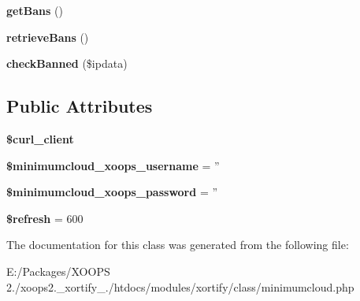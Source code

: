 \begin{DoxyCompactItemize}
\item 
\hypertarget{class_minimumcloud_xortify_exchange_a5246307afd025b45589d908c13a3e924}{{\bfseries get\-Bans} ()}\label{class_minimumcloud_xortify_exchange_a5246307afd025b45589d908c13a3e924}

\item 
\hypertarget{class_minimumcloud_xortify_exchange_a04a4e2d3d688861d870f45b76d5c78bc}{{\bfseries retrieve\-Bans} ()}\label{class_minimumcloud_xortify_exchange_a04a4e2d3d688861d870f45b76d5c78bc}

\item 
\hypertarget{class_minimumcloud_xortify_exchange_a4d1ab312c17a34bed16962dd4a697aec}{{\bfseries check\-Banned} (\$ipdata)}\label{class_minimumcloud_xortify_exchange_a4d1ab312c17a34bed16962dd4a697aec}

\end{DoxyCompactItemize}
\subsection*{Public Attributes}
\begin{DoxyCompactItemize}
\item 
\hypertarget{class_minimumcloud_xortify_exchange_a135683a265eb2392b131f21075be37db}{{\bfseries \$curl\-\_\-client}}\label{class_minimumcloud_xortify_exchange_a135683a265eb2392b131f21075be37db}

\item 
\hypertarget{class_minimumcloud_xortify_exchange_ad4cd260c2717aa6fb52976451707e1f4}{{\bfseries \$minimumcloud\-\_\-xoops\-\_\-username} = ''}\label{class_minimumcloud_xortify_exchange_ad4cd260c2717aa6fb52976451707e1f4}

\item 
\hypertarget{class_minimumcloud_xortify_exchange_acaf0e8669954065a25e32ff6c9cca796}{{\bfseries \$minimumcloud\-\_\-xoops\-\_\-password} = ''}\label{class_minimumcloud_xortify_exchange_acaf0e8669954065a25e32ff6c9cca796}

\item 
\hypertarget{class_minimumcloud_xortify_exchange_aec59bc066a59f3353ee3f39bdc4e0715}{{\bfseries \$refresh} = 600}\label{class_minimumcloud_xortify_exchange_aec59bc066a59f3353ee3f39bdc4e0715}

\end{DoxyCompactItemize}


The documentation for this class was generated from the following file\-:\begin{DoxyCompactItemize}
\item 
E\-:/\-Packages/\-X\-O\-O\-P\-S 2./xoops2.\-\_\-xortify\-\_./htdocs/modules/xortify/class/minimumcloud.\-php\end{DoxyCompactItemize}
